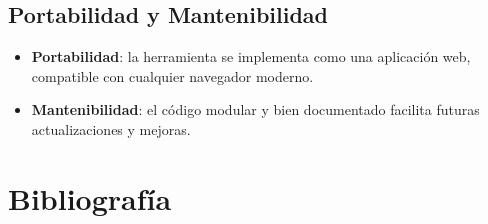 \documentclass[12pt,oneside]{templates/unerthesis}
\providecommand{\tightlist}{%
  \setlength{\itemsep}{0pt}\setlength{\parskip}{0pt}}
\begin{document}
\hypertarget{portabilidad-y-mantenibilidad}{%
\section{Portabilidad y Mantenibilidad}\label{portabilidad-y-mantenibilidad}}

\begin{itemize}
\tightlist
\item
  \textbf{Portabilidad}: la herramienta se implementa como una aplicación web, compatible con cualquier navegador moderno.
\item
  \textbf{Mantenibilidad}: el código modular y bien documentado facilita futuras actualizaciones y mejoras.
\end{itemize}

\hypertarget{Biblio}{%
\chapter{Bibliografía}\label{Biblio}}
\end{document}

